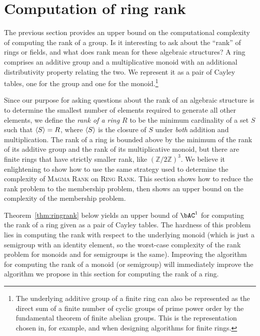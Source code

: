 \section{Computation of ring rank}

%
The previous section provides an upper bound on the computational complexity of computing the rank of a group.
Is it interesting to ask about the ``rank'' of rings or fields, and what does rank mean for these algebraic structures?
A ring comprises an additive group and a multiplicative monoid with an additional distributivity property relating the two.
We represent it as a pair of Cayley tables, one for the group and one for the monoid.\footnote{
  The underlying additive group of a finite ring can also be represented as the direct sum of a finite number of cyclic groups of prime power order by the fundamental theorem of finite abelian groups.
  This is the representation chosen in, for example, \autocite{av05} and \autocite{ks06}  when designing algorithms for finite rings.
}

Since our purpose for asking questions about the rank of an algebraic structure is to determine the smallest number of elements required to generate all other elements, we define the \emph{rank of a ring $R$} to be the minimum cardinality of a set $S$ such that $\langle S \rangle = R$, where $\langle S \rangle$ is the closure of $S$ under \emph{both} addition and multiplication.
The rank of a ring is bounded above by the minimum of the rank of its additive group and the rank of its multiplicative monoid, but there are finite rings that have strictly smaller rank, like $(\mathbb{Z} / 2 \mathbb{Z})^3$.
We believe it enlightening to show how to use the same strategy used to determine the complexity of \textsc{Magma Rank} on \textsc{Ring Rank}.
This section shows how to reduce the rank problem to the membership problem, then shows an upper bound on the complexity of the membership problem.

%
Theorem~\ref{thm:ringrank} below yields an upper bound of $\bAC^1$ for computing the rank of a ring given as a pair of Cayley tables.
The hardness of this problem lies in computing the rank with respect to the underlying monoid (which is just a semigroup with an identity element, so the worst-case complexity of the rank problem for monoids and for semigroups is the same).
Improving the algorithm for computing the rank of a monoid (or semigroup) will immediately improve the algorithm we propose in this section for computing the rank of a ring.

